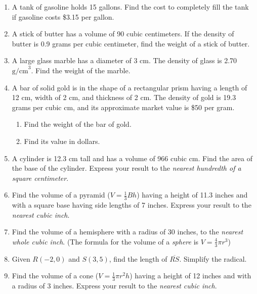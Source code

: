 \begin{enumerate}
\item A tank of gasoline holds 15 gallons. Find the cost to completely fill the tank if gasoline costs \$3.15 per gallon. %
\item A stick of butter has a volume of 90 cubic centimeters. If the density of butter is 0.9 grams per cubic centimeter, find the weight of a stick of butter. \vspace{3cm}
\item A large glass marble has a diameter of 3 cm. The density of glass is 2.70 $\mathrm{g/cm}^3$. Find the weight of the marble. %

\item A bar of solid gold is in the shape of a rectangular prism having a length of 12 cm, width of 2 cm, and thickness of 2 cm. The density of gold is 19.3 grams per cubic cm, and its approximate market value is \$50 per gram.
\begin{enumerate}
  \item Find the weight of the bar of gold.  %
  \item Find its value in dollars.
\end{enumerate}

\item A cylinder is 12.3 cm tall and has a volume of 966 cubic cm. Find the area of the base of the cylinder. Express your result to the \emph{nearest hundredth of a square centimeter}. %

\item Find the volume of a pyramid ($V=\frac{1}{3}Bh$) having a height of 11.3 inches and with a square base having side lengths of 7 inches. Express your result to the \emph{nearest cubic inch}. %

\item Find the volume of a hemisphere with a radius of 30 inches, to the \emph{nearest whole cubic inch}. (The formula for the volume of a \emph{sphere} is $V=\frac{4}{3}\pi r^3$)  %

\item Given $R(-2,0)$ and $S(3,5)$, find the length of $\overline{RS}$. Simplify the radical.
\item Find the volume of a cone ($V=\frac{1}{3}\pi r^2 h$) having a height of 12 inches and with a radius of 3 inches. Express your result to the \emph{nearest cubic inch}. %


\end{enumerate}
